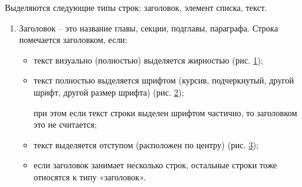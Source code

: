 \documentclass{ProcISPRAS}
\begin{document}
Выделяются следующие типы строк: заголовок, элемент списка, текст.

\begin{enumerate}
	\item Заголовок -- это название главы, секции, подглавы, параграфа. Строка помечается заголовком, если:
	\begin{itemize}
		\item текст визуально (полностью) выделяется жирностью (рис. \ref{fig:1});
		
		\begin{figure}[ht]
		    \label{fig:1}
		\end{figure}
		
		\item текст полностью выделяется шрифтом (курсив, подчеркнутый, другой шрифт, другой размер шрифта) (рис. \ref{fig:2});
		
		\begin{figure}[ht]
		    \label{fig:2}
		\end{figure}
		
		при этом если текст строки выделен шрифтом частично, то заголовком это не считается;
		
		\item текст выделяется отступом (расположен по центру) (рис. \ref{fig:3});
		
		\begin{figure}[ht]
		    \label{fig:3}
		\end{figure}
		
		\item если заголовок занимает несколько строк, остальные строки тоже относятся к типу «заголовок».
	\end{itemize}
	

\end{enumerate}
\end{document}
